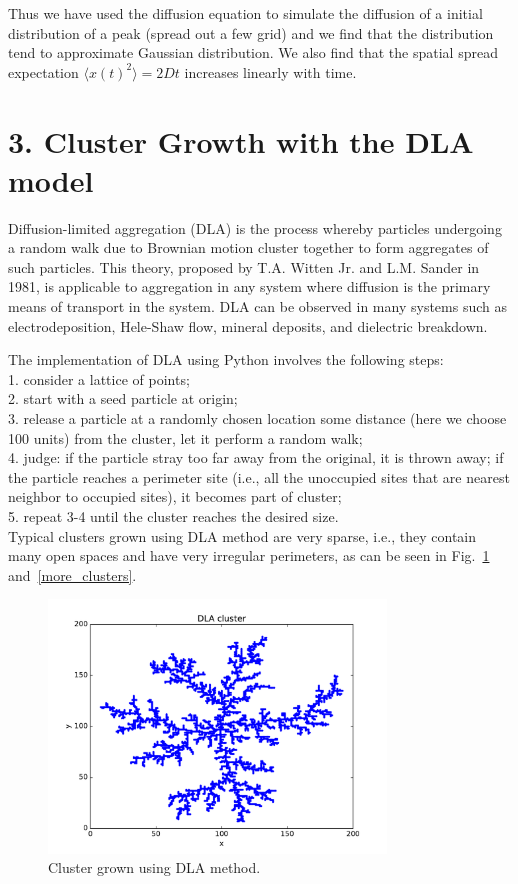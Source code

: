\documentclass[aps,prl,preprint,superscriptaddress]{revtex4}
\begin{document}
Thus we have used the diffusion equation to simulate the diffusion of a initial distribution of a peak (spread out a few grid) and we find that the distribution tend to approximate Gaussian distribution. We also find that the spatial spread expectation $\langle x(t)^2\rangle=2Dt$ increases linearly with time.

	\section{3. Cluster Growth with the DLA model}

Diffusion-limited aggregation (DLA) is the process whereby particles undergoing a random walk due to Brownian motion cluster together to form aggregates of such particles. This theory, proposed by T.A. Witten Jr. and L.M. Sander in 1981, is applicable to aggregation in any system where diffusion is the primary means of transport in the system. DLA can be observed in many systems such as electrodeposition, Hele-Shaw flow, mineral deposits, and dielectric breakdown.

The implementation of DLA using Python involves the following steps:\\
1. consider a lattice of points;\\
2. start with a seed particle at origin;\\
3. release a particle at a randomly chosen location some distance (here we choose 100 units) from the cluster, let it perform a random walk;\\
4. judge: if the particle stray too far away from the original, it is thrown away; if the particle reaches a perimeter site (i.e., all the unoccupied sites that are nearest neighbor to occupied sites), it becomes part of cluster;\\
5. repeat 3-4 until the cluster reaches the desired size.\\

Typical clusters grown using DLA method are very sparse, i.e., they contain many open spaces and have very irregular perimeters, as can be seen in Fig.~\ref{cluster} and~\ref{more_clusters}. 

\begin{figure}[H]
	\centering
	\includegraphics[width=0.8\textwidth]{dla.pdf}
	\caption{Cluster grown using DLA method. }
	\label{cluster}
\end{figure}
\end{document}
